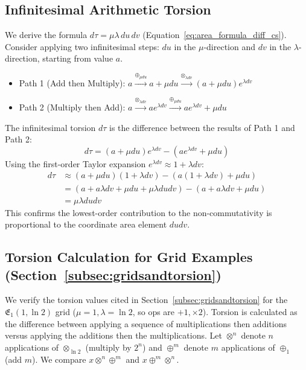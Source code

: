 \documentclass[12pt]{article}
\begin{document}
\subsection{Infinitesimal Arithmetic Torsion}
\label{app:infinitesimal_torsion}

We derive the formula \( d\tau = \mu \lambda \, du \, dv \) (Equation~\eqref{eq:area_formula_diff_cs}). Consider applying two infinitesimal steps: \( du \) in the \( \mu \)-direction and \( dv \) in the \( \lambda \)-direction, starting from value \( a \).
\begin{itemize}
    \item Path 1 (Add then Multiply): \( a \xrightarrow{\oplus_{\mu du}} a + \mu du \xrightarrow{\otimes_{\lambda dv}} (a + \mu du) e^{\lambda dv} \)
    \item Path 2 (Multiply then Add): \( a \xrightarrow{\otimes_{\lambda dv}} a e^{\lambda dv} \xrightarrow{\oplus_{\mu du}} a e^{\lambda dv} + \mu du \)
\end{itemize}
The infinitesimal torsion \( d\tau \) is the difference between the results of Path 1 and Path 2:
\[
d\tau = (a + \mu du) e^{\lambda dv} - (a e^{\lambda dv} + \mu du)
\]
Using the first-order Taylor expansion \( e^{\lambda dv} \approx 1 + \lambda dv \):
\begin{align*}
d\tau &\approx (a + \mu du) (1 + \lambda dv) - (a (1 + \lambda dv) + \mu du) \\
&= (a + a \lambda dv + \mu du + \mu \lambda du dv) - (a + a \lambda dv + \mu du) \\
&= \mu \lambda du dv
\end{align*}
This confirms the lowest-order contribution to the non-commutativity is proportional to the coordinate area element \( du dv \).

\subsection{Torsion Calculation for Grid Examples (Section~\ref{subsec:gridsandtorsion})} %
\label{app:grid_torsion_calc}

We verify the torsion values cited in Section~\ref{subsec:gridsandtorsion} for the \( \mathfrak{E}_1(1, \ln 2) \) grid (\(\mu=1, \lambda=\ln 2\), so ops are \(+1, \times 2\)). Torsion is calculated as the difference between applying a sequence of multiplications then additions versus applying the additions then the multiplications. Let \( \otimes^n \) denote \( n \) applications of \( \otimes_{\ln 2} \) (multiply by \( 2^n \)) and \( \oplus^m \) denote \( m \) applications of \( \oplus_1 \) (add \( m \)). We compare \( x \otimes^n \oplus^m \) and \( x \oplus^m \otimes^n \).
\end{document}

